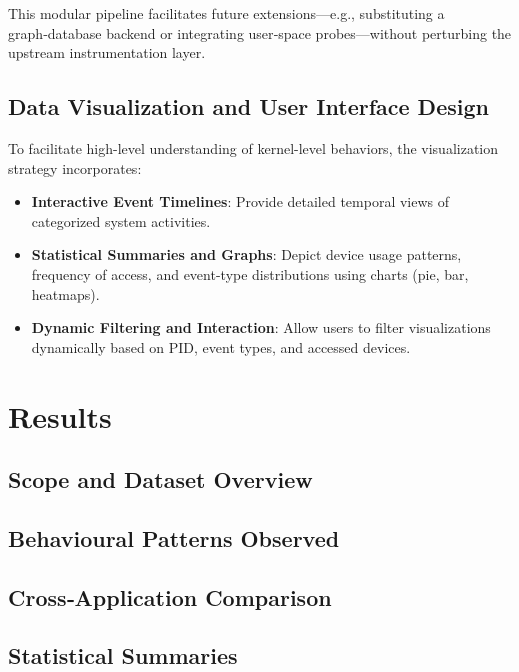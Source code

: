 \documentclass[a4paper,12pt]{report}
\begin{document}
This modular pipeline facilitates future extensions—e.g., substituting a graph‑database backend or integrating user‑space probes—without perturbing the upstream instrumentation layer.


\section{Data Visualization and User Interface Design}
To facilitate high-level understanding of kernel-level behaviors, the visualization strategy incorporates:
\begin{itemize}
\item \textbf{Interactive Event Timelines}: Provide detailed temporal views of categorized system activities.
\item \textbf{Statistical Summaries and Graphs}: Depict device usage patterns, frequency of access, and event-type distributions using charts (pie, bar, heatmaps).
\item \textbf{Dynamic Filtering and Interaction}: Allow users to filter visualizations dynamically based on PID, event types, and accessed devices.
\end{itemize}



\chapter{Results}
\section{Scope and Dataset Overview}\label{sec:results:dataset}

\section{Behavioural Patterns Observed}\label{sec:results:patterns}

\section{Cross‑Application Comparison}\label{sec:results:comparison}

\section{Statistical Summaries}\label{sec:results:stats}
\end{document}
